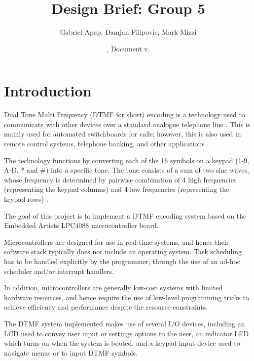 \documentclass[11pt,a4paper,twocolumn]{scrartcl}
\title{Design Brief: Group 5}
\author{
   Gabriel Apap,
   Damjan Filipovic,
   Mark Mizzi
   }
\date{\svnMaxToday, Document v.\svnInfoMaxRevision}
\begin{document}
\maketitle


\section{Introduction}

   Dual Tone Multi Frequency (DTMF for short) encoding is a technology used to communicate with other devices over a standard analogue telephone line \cite{sl:an218}. This is mainly used for automated switchboards for calls; however, this is also used in remote control systems, telephone banking, and other applications \cite{sl:an218}.

   The technology functions by converting each of the 16 symbols on a keypad (1-9, A-D, * and \#) into a specific tone. The tone consists of a sum of two sine waves, whose frequency is determined by pairwise combination of 4 high frequencies (representing the keypad columns) and 4 low frequencies (representing the keypad rows) \cite{sl:an218}.

   The goal of this project is to implement a DTMF encoding system based on the Embedded Artists LPC4088 microcontroller board.

   Microcontrollers are designed for use in real-time systems, and hence their software stack typically does not include an operating system. Task scheduling has to be handled explicitly by the programmer, through the use of an ad-hoc scheduler and/or interrupt handlers.

   In addition, microcontrollers are generally low-cost systems with limited hardware resources, and hence require the use of low-level programming tricks to achieve efficiency and performance despite the resource constraints.
   
   The DTMF system implemented makes use of several I/O devices, including an LCD used to convey user input or settings options to the user,
   an indicator LED which turns on when the system is booted, and a keypad input device used to navigate menus or to input DTMF symbols.
\end{document}
